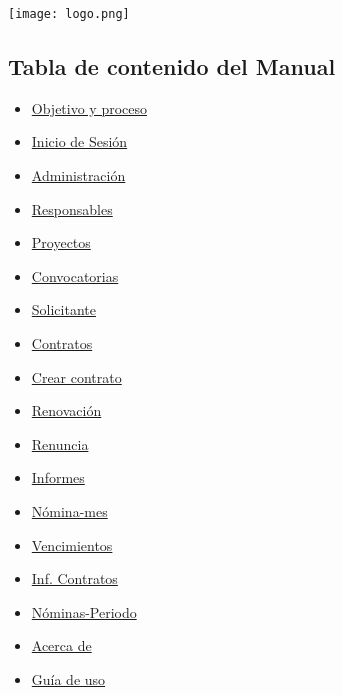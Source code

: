 \begin{center}
	\texttt{[image: logo.png]}
\end{center}

\label{manual-usuario}

\subsection*{Tabla de contenido del Manual}
\begin{itemize}
	\item \hyperref[objetivo-y-proceso]{Objetivo y proceso} \dotfill \pageref{objetivo-y-proceso}
	\item \hyperref[inicio-de-sesion]{Inicio de Sesión} \dotfill \pageref{inicio-de-sesion} 
	\item \hyperref[administracion]{Administración} \dotfill \pageref{administracion}
	\item \hyperref[responsables]{Responsables} \dotfill \pageref{responsables}
	\item \hyperref[proyectos]{Proyectos} \dotfill \pageref{proyectos}
	\item \hyperref[convocatorias]{Convocatorias} \dotfill \pageref{convocatorias}
	\item \hyperref[solicitante]{Solicitante} \dotfill \pageref{solicitante}
	\item \hyperref[contratos]{Contratos} \dotfill \pageref{contratos}
	\item \hyperref[crear]{Crear contrato} \dotfill \pageref{crear}
	\item \hyperref[renovacion]{Renovación} \dotfill \pageref{renovacion}
	\item \hyperref[renuncia]{Renuncia} \dotfill \pageref{renuncia}
	\item \hyperref[informes]{Informes} \dotfill \pageref{informes}
	\item \hyperref[nomina-mes]{Nómina-mes} \dotfill \pageref{nomina-mes}
	\item \hyperref[vencimientos]{Vencimientos} \dotfill \pageref{vencimientos}
	\item \hyperref[contratos-1]{Inf. Contratos} \dotfill \pageref{contratos-1}
	\item \hyperref[nominas-periodo]{Nóminas-Periodo} \dotfill \pageref{nominas-periodo}
	\item \hyperref[acerca-de]{Acerca de} \dotfill \pageref{acerca-de}
	\item \hyperref[guia-de-uso]{Guía de uso} \dotfill \pageref{guia-de-uso}
\end{itemize}

